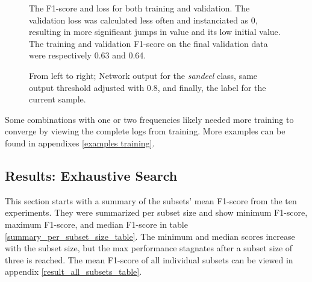         \begin{figure}[H]
            \centering
            \qquad
            \caption[Loss and F1 score during training]{The F1-score and loss for both training and validation. The validation loss was calculated less often and instanciated as 0, resulting in more significant jumps in value and its low initial value. The training and validation F1-score on the final validation data were respectively 0.63 and 0.64.}%
            \label{loss_f1_duo_plot_fig}%
        \end{figure}
        \begin{figure}[H]
            \centering
            
            \caption[Example output, threshold and label]{From left to right; Network output for the \textit{sandeel} class, same output threshold adjusted with 0.8, and finally, the label for the current sample.}
          	\medskip 
            \label{sandeel_threshold_label}
        \end{figure}
    
    
     Some combinations with one or two frequencies likely needed more training to converge by viewing the complete logs from training. More examples can be found in appendixes \ref{examples training}.
    

\subsection{Results: Exhaustive Search}
    This section starts with a summary of the subsets' mean F1-score from the ten experiments. They were summarized per subset size and show minimum F1-score, maximum F1-score, and median F1-score in table \ref{summary_per_subset_size_table}. The minimum and median scores increase with the subset size, but the max performance stagnates after a subset size of three is reached. The mean F1-score of all individual subsets can be viewed in appendix \ref{result_all_subsets_table}. 


